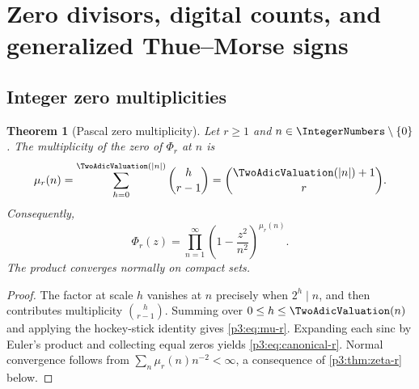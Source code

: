 \documentclass[11pt,oneside]{article}
\newtheorem{theorem}{Theorem}[section]
\theoremstyle{definition}
\theoremstyle{remark}
\begin{document}
\section{Zero divisors, digital counts, and generalized Thue--Morse signs}\label{p3:sec:digital}

\subsection{Integer zero multiplicities}

\begin{theorem}[Pascal zero multiplicity]\label{p3:thm:zero-multiplicity}
Let $r\ge1$ and $n\in\IntegerNumbers\setminus\{0\}$.  The multiplicity of the zero of $\Phi_r$ at $n$ is
\begin{equation}\label{p3:eq:mu-r}
  \mu_r(n)=\sum_{h=0}^{\TwoAdicValuation(|n|)}\binom h{r-1}
  =\binom{\TwoAdicValuation(|n|)+1}{r}.
\end{equation}
Consequently,
\begin{equation}\label{p3:eq:canonical-r}
  \Phi_r(z)=\prod_{n=1}^{\infty}
  \left(1-\frac{z^2}{n^2}\right)^{\mu_r(n)}.
\end{equation}
The product converges normally on compact sets.
\end{theorem}

\begin{proof}
The factor at scale $h$ vanishes at $n$ precisely when $2^h\mid n$, and then contributes multiplicity $\binom h{r-1}$.  Summing over $0\le h\le\TwoAdicValuation(n)$ and applying the hockey-stick identity gives \eqref{p3:eq:mu-r}.  Expanding each sinc by Euler's product and collecting equal zeros yields \eqref{p3:eq:canonical-r}.  Normal convergence follows from
$\sum_n\mu_r(n)n^{-2}<\infty$, a consequence of \cref{p3:thm:zeta-r} below.
\end{proof}
\end{document}
